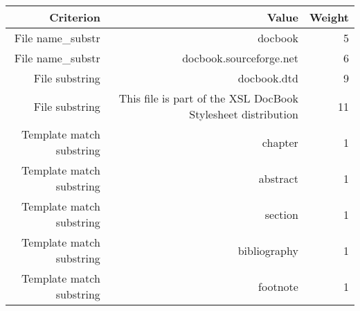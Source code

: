 \begin{tabular}{|r|r|r|}
\hline
\bf Criterion&\bf Value&\bf Weight\\
\hline
File name_substr&docbook&5\\
\hline
File name_substr&docbook.sourceforge.net&6\\
\hline
File substring&docbook.dtd&9\\
\hline
File substring&This file is part of the XSL DocBook Stylesheet distribution&11\\
\hline
Template match substring&chapter&1\\
\hline
Template match substring&abstract&1\\
\hline
Template match substring&section&1\\
\hline
Template match substring&bibliography&1\\
\hline
Template match substring&footnote&1\\
\hline
\end{tabular}
